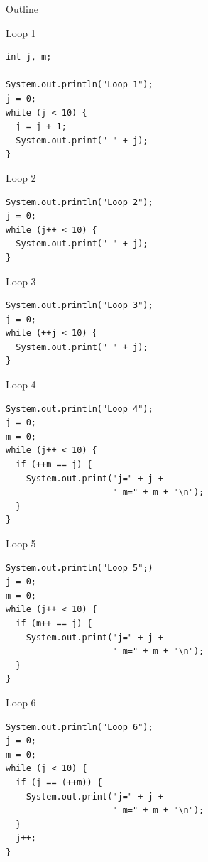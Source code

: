 \begin{frame}{Outline}
  \tableofcontents[current]
\end{frame}

\begin{frame}[fragile]{Loop 1}
  \begin{lstlisting}
int j, m;

System.out.println("Loop 1");
j = 0;
while (j < 10) {
  j = j + 1;
  System.out.print(" " + j);
}
  \end{lstlisting}
\end{frame}

\begin{frame}[fragile]{Loop 2}
  \begin{lstlisting}
System.out.println("Loop 2");
j = 0;
while (j++ < 10) {
  System.out.print(" " + j);
}
  \end{lstlisting}
\end{frame}

\begin{frame}[fragile]{Loop 3}
  \begin{lstlisting}
System.out.println("Loop 3");
j = 0;
while (++j < 10) {
  System.out.print(" " + j);
}
  \end{lstlisting}
\end{frame}

\begin{frame}[fragile]{Loop 4}
  \begin{lstlisting}
System.out.println("Loop 4");
j = 0;
m = 0;
while (j++ < 10) {
  if (++m == j) {
    System.out.print("j=" + j + 
                     " m=" + m + "\n");
  }
}
  \end{lstlisting}
\end{frame}

\begin{frame}[fragile]{Loop 5}
  \begin{lstlisting}
System.out.println("Loop 5";)
j = 0;
m = 0;
while (j++ < 10) {
  if (m++ == j) {
    System.out.print("j=" + j + 
                     " m=" + m + "\n");
  }
}
  \end{lstlisting}
\end{frame}

\begin{frame}[fragile]{Loop 6}
  \begin{lstlisting}
System.out.println("Loop 6");
j = 0;
m = 0;
while (j < 10) {
  if (j == (++m)) {
    System.out.print("j=" + j + 
                     " m=" + m + "\n");
  }
  j++;
}
  \end{lstlisting}
\end{frame}

